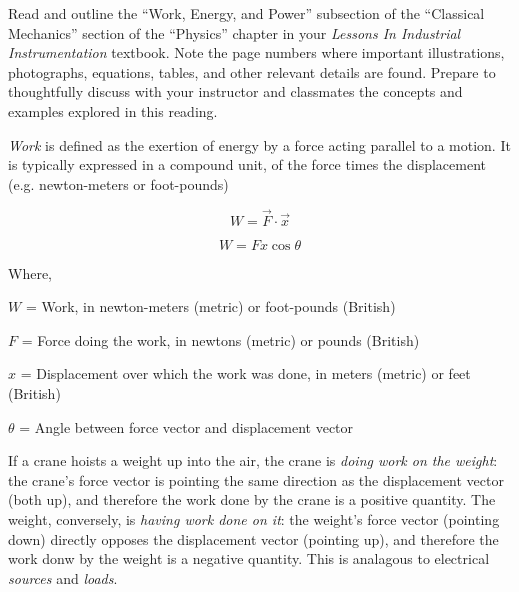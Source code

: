 

Read and outline the ``Work, Energy, and Power'' subsection of the ``Classical Mechanics'' section of the ``Physics'' chapter in your {\it Lessons In Industrial Instrumentation} textbook.  Note the page numbers where important illustrations, photographs, equations, tables, and other relevant details are found.  Prepare to thoughtfully discuss with your instructor and classmates the concepts and examples explored in this reading.














{\it Work} is defined as the exertion of energy by a force acting parallel to a motion.  It is typically expressed in a compound unit, of the force times the displacement (e.g. newton-meters or foot-pounds)

$$W = \vec F \cdot \vec x$$

$$W = F x \cos \theta$$

\noindent
Where,

$W$ = Work, in newton-meters (metric) or foot-pounds (British)

$F$ = Force doing the work, in newtons (metric) or pounds (British)

$x$ = Displacement over which the work was done, in meters (metric) or feet (British)

$\theta$ = Angle between force vector and displacement vector

\vskip 10pt

If a crane hoists a weight up into the air, the crane is {\it doing work on the weight}: the crane's force vector is pointing the same direction as the displacement vector (both up), and therefore the work done by the crane is a positive quantity.  The weight, conversely, is {\it having work done on it}: the weight's force vector (pointing down) directly opposes the displacement vector (pointing up), and therefore the work donw by the weight is a negative quantity.  This is analagous to electrical {\it sources} and {\it loads}.

